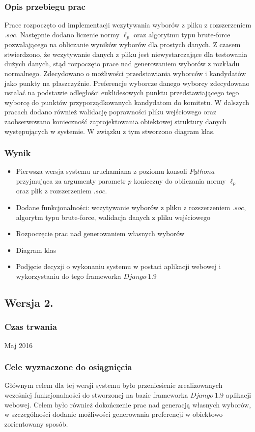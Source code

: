 \documentclass[pdflatex,11pt]{../aghdoc_version2}
\begin{document}
\subsubsection{Opis przebiegu prac}
Prace rozpoczęto od implementacji wczytywania wyborów z pliku z rozszerzeniem $.soc$.
Następnie dodano liczenie normy $\ell_p$ oraz algorytmu typu brute-force pozwalającego na
obliczanie wyników wyborów dla prostych danych. Z czasem stwierdzono, że wczytywanie
danych z pliku jest niewystarczające dla testowania dużych danych, stąd rozpoczęto prace
nad generowaniem wyborów z rozkładu normalnego. Zdecydowano o możliwości
przedstawiania wyborców i kandydatów jako punkty na płaszczyźnie. Preferencje wyborcze
danego wyborcy zdecydowano ustalać na podstawie odległości euklidesowych punktu
przedstawiającego tego wyborcę do punktów przyporządkowanych kandydatom do komitetu.
W dalszych pracach dodano również walidację poprawności pliku wejściowego oraz
zaobserwowano konieczność zaprojektowania obiektowej struktury danych występujących w
systemie. W związku z tym stworzono diagram klas.
\subsubsection{Wynik}
\begin{itemize}
\item Pierwsza wersja systemu uruchamiana z poziomu konsoli $Pythona$ przyjmująca za
argumenty parametr $p$ konieczny do obliczania normy $\ell_p$ oraz plik z rozszerzeniem
$.soc$.
\item Dodane funkcjonalności: wczytywanie wyborów z pliku z rozszerzeniem $.soc$,
algorytm typu brute-force, walidacja danych z pliku wejściowego
\item Rozpoczęcie prac nad generowaniem własnych wyborów
\item Diagram klas
\item Podjęcie decyzji o wykonaniu systemu w postaci aplikacji webowej i wykorzystaniu
do tego frameworka $Django \ 1.9$
\end{itemize}
\subsection{Wersja 2.}
\subsubsection{Czas trwania}
Maj 2016
\subsubsection{Cele wyznaczone do osiągnięcia}
Głównym celem dla tej wersji systemu było przeniesienie zrealizowanych wcześniej
funkcjonalności do stworzonej na bazie frameworka $Django \ 1.9$ aplikacji webowej. Celem
było również dokończenie prac nad generacją własnych wyborów, w szczególności dodanie
możliwości generowania preferencji w obiektowo zorientowany sposób.
\end{document}
